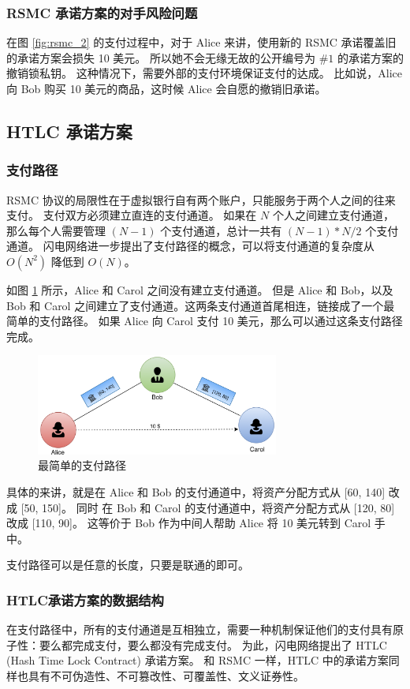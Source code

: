 \subsubsection{RSMC 承诺方案的对手风险问题}
在图 \ref{fig:rsmc_2} 的支付过程中，对于 Alice 来讲，使用新的 RSMC 承诺覆盖旧的承诺方案会损失 10 美元。
所以她不会无缘无故的公开编号为 $\#1$ 的承诺方案的撤销锁私钥。
这种情况下，需要外部的支付环境保证支付的达成。
比如说，Alice 向 Bob 购买 10 美元的商品，这时候 Alice 会自愿的撤销旧承诺。

\subsection{HTLC 承诺方案}\label{sec:htlc}
\subsubsection{支付路径}
RSMC 协议的局限性在于虚拟银行自有两个账户，只能服务于两个人之间的往来支付。
支付双方必须建立直连的支付通道。
如果在 $N$ 个人之间建立支付通道，那么每个人需要管理 $(N-1)$ 个支付通道，总计一共有 $(N - 1)*N/2$  个支付通道。
闪电网络进一步提出了支付路径的概念，可以将支付通道的复杂度从 $O(N^2)$ 降低到 $O(N)$。

如图 \ref{fig:alice_bob_carol} 所示，Alice 和 Carol 之间没有建立支付通道。
但是 Alice 和 Bob，以及 Bob 和 Carol 之间建立了支付通道。这两条支付通道首尾相连，链接成了一个最简单的支付路径。
如果 Alice 向 Carol 支付 10 美元，那么可以通过这条支付路径完成。

\begin{figure}[h!]
    \centering
    \includegraphics[width=8cm, keepaspectratio]{../images/channels_1.png}
    \caption{最简单的支付路径}
    \label{fig:alice_bob_carol}
\end{figure}

具体的来讲，就是在 Alice 和 Bob 的支付通道中，将资产分配方式从 [60, 140] 改成 [50, 150]。
同时 在 Bob 和 Carol 的支付通道中，将资产分配方式从 [120, 80] 改成 [110, 90]。
这等价于 Bob 作为中间人帮助 Alice 将 10 美元转到 Carol 手中。

支付路径可以是任意的长度，只要是联通的即可。

\subsubsection{HTLC承诺方案的数据结构}
在支付路径中，所有的支付通道是互相独立，需要一种机制保证他们的支付具有原子性：要么都完成支付，要么都没有完成支付。
为此，闪电网络提出了 HTLC (Hash Time Lock Contract) 承诺方案。
和 RSMC 一样，HTLC 中的承诺方案同样也具有不可伪造性、不可篡改性、可覆盖性、文义证券性。

